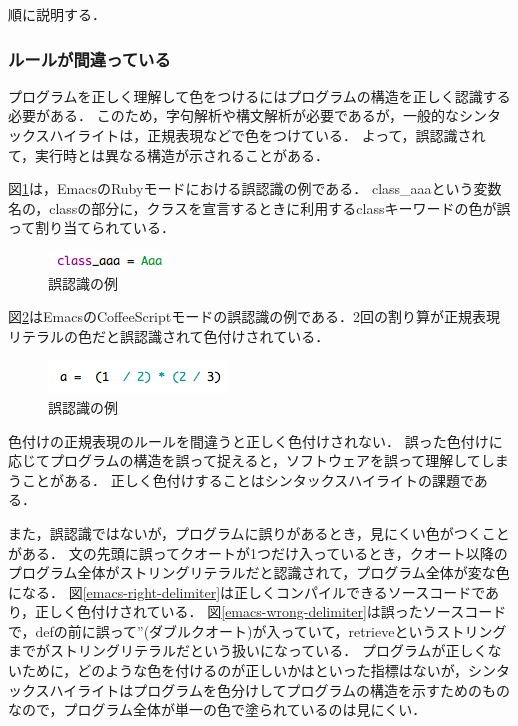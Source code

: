 \documentclass{cs-thesis}
\begin{document}
  順に説明する．

  \subsubsection{ルールが間違っている}
  プログラムを正しく理解して色をつけるにはプログラムの構造を正しく認識する必要がある．
  このため，字句解析や構文解析が必要であるが，一般的なシンタックスハイライトは，正規表現などで色をつけている．
  よって，誤認識されて，実行時とは異なる構造が示されることがある．

  図\ref{emacs-class-aaa}は，EmacsのRubyモードにおける誤認識の例である．
  class\_aaaという変数名の，classの部分に，クラスを宣言するときに利用するclassキーワードの色が誤って割り当てられている．


  \begin{figure}[htbp]
   \centering
   \includegraphics[scale=0.8]{emacs-class-aaa.png}
   \caption{誤認識の例}
   \label{emacs-class-aaa}
  \end{figure}



  図\ref{emacs-divide}はEmacsのCoffeeScriptモードの誤認識の例である．2回の割り算が正規表現リテラルの色だと誤認識されて色付けされている．


  \begin{figure}[htbp]
   \centering
   \includegraphics[scale=0.8]{emacs-divide.png}
   \caption{誤認識の例}
   \label{emacs-divide}
  \end{figure}

  色付けの正規表現のルールを間違うと正しく色付けされない．
  誤った色付けに応じてプログラムの構造を誤って捉えると，ソフトウェアを誤って理解してしまうことがある．
  正しく色付けすることはシンタックスハイライトの課題である．

  また，誤認識ではないが，プログラムに誤りがあるとき，見にくい色がつくことがある．
  文の先頭に誤ってクオートが1つだけ入っているとき，クオート以降のプログラム全体がストリングリテラルだと認識されて，プログラム全体が変な色になる．
  図\ref{emacs-right-delimiter}は正しくコンパイルできるソースコードであり，正しく色付けされている．
  図\ref{emacs-wrong-delimiter}は誤ったソースコードで，defの前に誤って''(ダブルクオート)が入っていて，retrieveというストリングまでがストリングリテラルだという扱いになっている．
  プログラムが正しくないために，どのような色を付けるのが正しいかはといった指標はないが，シンタックスハイライトはプログラムを色分けしてプログラムの構造を示すためのものなので，プログラム全体が単一の色で塗られているのは見にくい．
\end{document}
